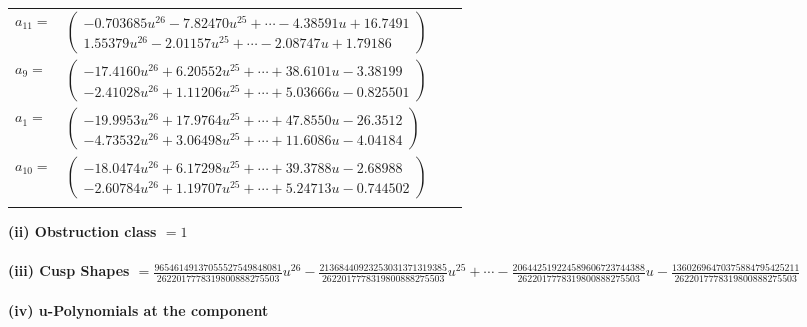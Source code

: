 \documentclass[1p]{elsarticle_modified}
\theoremstyle{definition}
\begin{document}
\begin{tabular}{m{7pt} m{180pt} m{7pt} m{180pt} }
\flushright $a_{11}=$&$\begin{pmatrix}-0.703685 u^{26}-7.82470 u^{25}+\cdots-4.38591 u+16.7491\\1.55379 u^{26}-2.01157 u^{25}+\cdots-2.08747 u+1.79186\end{pmatrix}$ \\
\flushright $a_{9}=$&$\begin{pmatrix}-17.4160 u^{26}+6.20552 u^{25}+\cdots+38.6101 u-3.38199\\-2.41028 u^{26}+1.11206 u^{25}+\cdots+5.03666 u-0.825501\end{pmatrix}$ \\
\flushright $a_{1}=$&$\begin{pmatrix}-19.9953 u^{26}+17.9764 u^{25}+\cdots+47.8550 u-26.3512\\-4.73532 u^{26}+3.06498 u^{25}+\cdots+11.6086 u-4.04184\end{pmatrix}$ \\
\flushright $a_{10}=$&$\begin{pmatrix}-18.0474 u^{26}+6.17298 u^{25}+\cdots+39.3788 u-2.68988\\-2.60784 u^{26}+1.19707 u^{25}+\cdots+5.24713 u-0.744502\end{pmatrix}$\\&\end{tabular}
\flushleft \textbf{(ii) Obstruction class $= 1$}\\~\\
\flushleft \textbf{(iii) Cusp Shapes $= \frac{96546149137055527549848081}{2622017778319800888275503} u^{26}-\frac{21368440923253031371319385}{2622017778319800888275503} u^{25}+\cdots-\frac{206442519224589606723744388}{2622017778319800888275503} u-\frac{13602696470375884795425211}{2622017778319800888275503}$}\\~\\
\newpage\renewcommand{\arraystretch}{1}
\flushleft \textbf{(iv) u-Polynomials at the component}\newline \\
\end{document}
